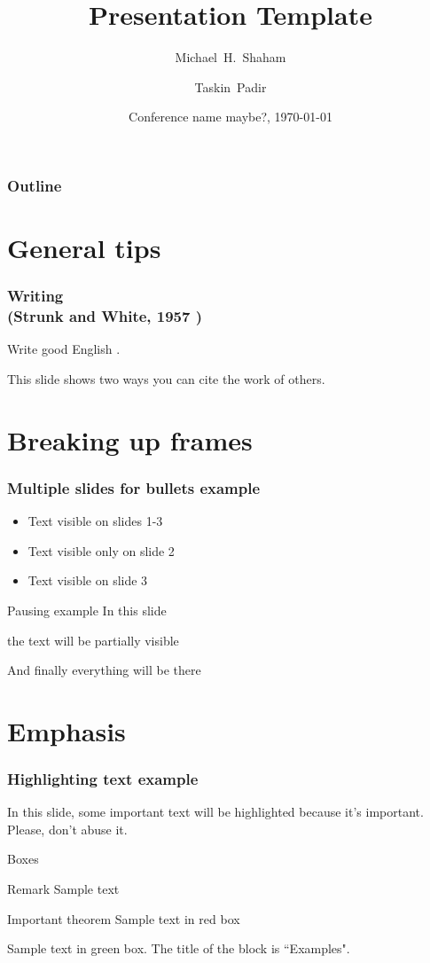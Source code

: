 \documentclass[mathserif]{beamer}
\title[Presentation Template] %
{\bfseries Presentation Template}
\author[Shaham, Michael] %
{Michael~H.~Shaham\inst{1} \and Taskin~Padir\inst{2}}
\institute[NU] %
{
  \inst{1}%
  RIVeR Lab\\
  Northeastern University
  \and
  \inst{2}%
  Director, Institute for Experiential Robotics\\
  Northeastern University
}
\date[Conf 2022] %
{Conference name maybe?, \monthyeardate\today} %
\begin{document}
\frame{\titlepage}

\begin{frame}
\frametitle{Outline}
\tableofcontents
\end{frame}

\section{General tips}

\begin{frame}
\frametitle{Writing\\[-0.3em] 
{\footnotesize \textmd{(Strunk and White, 1957 \cite{SW:57})}}}
Write good English \cite{SW:57}. 

This slide shows two ways you can cite the work of others.
\end{frame}

\section{Breaking up frames}

\begin{frame}
\frametitle{Multiple slides for bullets example}
\begin{itemize}
    \item<1-> Text visible on slides 1-3
    \item<2> Text visible only on slide 2
    \item<3-> Text visible on slide 3
\end{itemize}
\end{frame}

\begin{frame}{Pausing example}
In this slide \pause

the text will be partially visible \pause

And finally everything will be there
\end{frame}

\section{Emphasis}

\begin{frame}
\frametitle{Highlighting text example}
In this slide, some important text will be
\alert{highlighted} because it's important.
Please, don't abuse it.
\end{frame}

\begin{frame}{Boxes}

\begin{block}{Remark}
Sample text
\end{block}

\begin{alertblock}{Important theorem}
Sample text in red box
\end{alertblock}

\begin{examples}
Sample text in green box. The title of the block is ``Examples".
\end{examples}
\end{frame}
\end{document}
